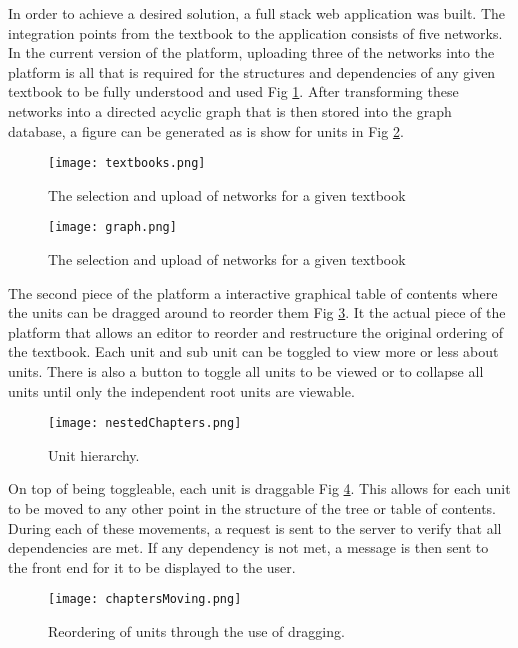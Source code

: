 In order to achieve a desired solution, a full stack web application was built. The integration points from the textbook to the application consists of five networks. In the current version of the platform, uploading three of the networks into the platform is all that is required for the structures and dependencies of any given textbook to be fully understood and used Fig \ref{fig:textbooks}. After transforming these networks into a directed acyclic graph that is then stored into the graph database, a figure can be generated as is show for units in Fig \ref{fig:graph}.

\begin{figure}[ht]
    \centering
    \texttt{[image: textbooks.png]}
    \caption[Textbook selection.]{The selection and upload of networks for a given textbook}
        
    \label{fig:textbooks}
\end{figure}

\begin{figure}[ht]
    \centering
    \texttt{[image: graph.png]}
    \caption[Textbook selection.]{The selection and upload of networks for a given textbook}
        
    \label{fig:graph}
\end{figure}


The second piece of the platform a interactive graphical table of contents where the units can be dragged around to reorder them Fig \ref{fig:nestedChapters}. It the actual piece of the platform that allows an editor to reorder and restructure the original ordering of the textbook. Each unit and sub unit can be toggled to view more or less about units. There is also a button to toggle all units to be viewed or to collapse all units until only the independent root units are viewable.

\begin{figure}[ht]
    \centering
    \texttt{[image: nestedChapters.png]}
    \caption[Unit hierarchy.]{Unit hierarchy.}
        
    \label{fig:nestedChapters}
\end{figure}

\pagebreak

On top of being toggleable, each unit is draggable Fig \ref{fig:chaptersMoving}. This allows for each unit to be moved to any other point in the structure of the tree or table of contents. During each of these movements, a request is sent to the server to verify that all dependencies are met. If any dependency is not met, a message is then sent to the front end for it to be displayed to the user.

\begin{figure}[ht]
    \centering
    \texttt{[image: chaptersMoving.png]}
    \caption[Reordering units.]{Reordering of units through the use of dragging.}
        
    \label{fig:chaptersMoving}
\end{figure}

\pagebreak
